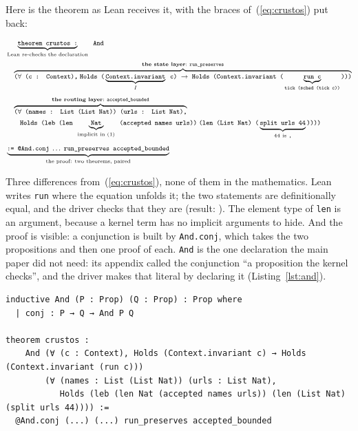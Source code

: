 \documentclass[11pt]{article}
\newcommand{\code}[1]{\texttt{#1}}
\newcommand{\lc}[1]{\texttt{#1}}
\begin{document}
Here is the theorem as Lean receives it, with the braces of~(\ref{eq:crustos})
put back:

\begin{equation}
\label{eq:lean}
\footnotesize
\begin{aligned}
&\underbrace{\lc{theorem crustos :}}_{\text{Lean re-checks the declaration}}\;\;\lc{And}
\\[0.5ex]
&\quad\overbrace{\lc{($\forall$ (c : Context),}\;
  \lc{Holds (}\underbrace{\lc{Context.invariant}}_{I}\lc{ c)}\;\to\;
  \lc{Holds (Context.invariant (}\underbrace{\lc{run c}}_{\lc{tick (sched (tick c))}}\lc{)))}}^{\textbf{the state layer}:\ \code{run\_preserves}}
\\[1ex]
&\quad\overbrace{\lc{($\forall$ (names : List (List Nat)) (urls : List Nat),}}^{\textbf{the routing layer}:\ \code{accepted\_bounded}}
\\[0.3ex]
&\qquad\lc{Holds (leb (len }\underbrace{\lc{Nat}}_{\text{implicit in (1)}}\lc{ (accepted names urls))}\;
  \lc{(len (List Nat) (}\underbrace{\lc{split urls 44}}_{44\ \text{is}\ \code{,}}\lc{))))}
\\[1ex]
&\underbrace{\lc{:= @And.conj}\;\ldots\;\lc{run\_preserves accepted\_bounded}}_{\text{the proof: two theorems, paired}}
\end{aligned}
\end{equation}

Three differences from~(\ref{eq:crustos}), none of them in the mathematics.
Lean writes \code{run} where the equation unfolds it; the two statements are
definitionally equal, and the driver checks that they are
(result: \unfoldedAgrees). The element type of \code{len} is an argument, because a
kernel term has no implicit arguments to hide. And the proof is visible: a
conjunction is built by \code{And.conj}, which takes the two propositions and
then one proof of each. \code{And} is the one declaration the main paper did
not need: its appendix called the conjunction ``a proposition the kernel
checks'', and the driver makes that literal by declaring it
(Listing~\ref{lst:and}).

\begin{lstlisting}[style=lean,caption={The conjunction, as exported. The whole proof is the last line.},label={lst:and}]
inductive And (P : Prop) (Q : Prop) : Prop where
  | conj : P → Q → And P Q

theorem crustos :
    And (∀ (c : Context), Holds (Context.invariant c) → Holds (Context.invariant (run c)))
        (∀ (names : List (List Nat)) (urls : List Nat),
           Holds (leb (len Nat (accepted names urls)) (len (List Nat) (split urls 44)))) :=
  @And.conj (...) (...) run_preserves accepted_bounded
\end{lstlisting}
\end{document}
